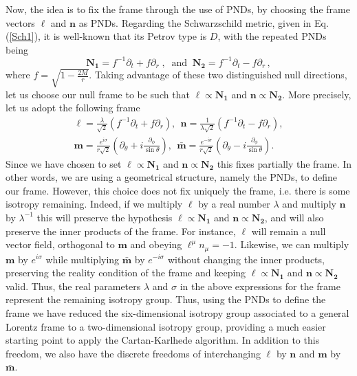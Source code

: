 \documentclass[twocolumn,prd,aps,showpacs,showkeys,amsmath,amssymb]{revtex4-1}
\newcommand{\bl}{\boldsymbol}
\begin{document}
Now, the idea is to fix the frame through the use of PNDs, by choosing the frame vectors  $\bl{\ell}$ and $\bl{n}$ as PNDs. Regarding the Schwarzschild metric, given in Eq. (\ref{Sch1}), it is well-known that its Petrov type is $D$, with the repeated PNDs being
\begin{equation*}
  \bl{N_1} =  f^{-1} \partial_t + f \partial_r \;,\;\;\textrm{and}\;\; \bl{N_2} =  f^{-1} \partial_t - f \partial_r \,,
\end{equation*}
where $f = \sqrt{1- \frac{2M}{r}}$. Taking advantage of these two distinguished null directions, let us choose our null frame to be such that $\bl{\ell}\propto \bl{N_1}$ and  $\bl{n}\propto \bl{N_2}$. More precisely, let us adopt the following frame
\begin{align*}
\bl{\ell} =  \frac{\lambda}{\sqrt{2}}\left( f^{-1} \partial_t + f \partial_r \right) ,\;\,
\bl{n} =  \frac{1}{\lambda \sqrt{2}}\left( f^{-1} \partial_t - f \partial_r \right) ,\\
  \bl{m} =  \frac{e^{i\sigma}}{r\sqrt{2}}\left(  \partial_\theta +i \frac{\partial_\phi}{\sin\theta}   \right) ,\;\,
 \bl{\bar{m}} =  \frac{e^{-i\sigma}}{r\sqrt{2}}\left(  \partial_\theta -i \frac{\partial_\phi}{\sin\theta}  \right).
\end{align*}
Since we have chosen to set $\bl{\ell}\propto \bl{N_1}$ and  $\bl{n}\propto \bl{N_2}$ this fixes partially the frame. In other words, we are using a geometrical structure, namely the PNDs, to define our frame. However, this choice does not fix uniquely the frame, i.e. there is some isotropy remaining. Indeed, if we multiply $\bl{\ell}$ by a real number $\lambda$ and multiply $\bl{n}$ by $\lambda^{-1}$ this will preserve the hypothesis
$\bl{\ell}\propto \bl{N_1}$ and  $\bl{n}\propto \bl{N_2}$, and will also preserve the inner products of the frame. For instance, $\bl{\ell}$ will remain a null vector field, orthogonal to $\bl{m}$ and obeying $\ell^\mu n_\mu = -1$. Likewise, we can multiply $\bl{m}$ by $e^{i\sigma}$ while multiplying $\bl{\bar{m}}$ by $e^{-i\sigma}$ without changing the inner products, preserving the reality condition of the frame and keeping $\bl{\ell}\propto \bl{N_1}$ and  $\bl{n}\propto \bl{N_2}$ valid. Thus, the real parameters $\lambda$ and $\sigma$ in the above expressions for the frame represent the remaining isotropy group. Thus, using the PNDs to define the frame we have reduced the six-dimensional isotropy group associated to a general Lorentz frame to a two-dimensional isotropy group, providing a much easier starting point to apply the Cartan-Karlhede algorithm. In addition to this freedom, we also have the discrete freedoms of interchanging $\bl{\ell}$ by $\bl{n}$ and $\bl{m}$ by $\bl{\bar{m}}$.
\end{document}
